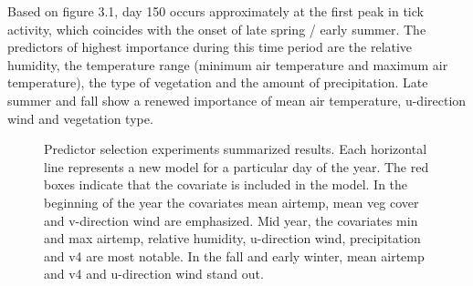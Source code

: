 \noindent Based on figure 3.1, day 150 occurs approximately at the first peak in tick activity, which coincides with the onset of late spring / early summer. The predictors of highest importance during this time period are the relative humidity, the temperature range (minimum air temperature and maximum air temperature), the type of vegetation and the amount of precipitation. Late summer and fall show a renewed importance of mean air temperature, u-direction wind and vegetation type.  \newline

\begin{figure} [!ht]
\centerline{}
\caption{Predictor selection experiments summarized results. Each horizontal line represents a new model for a particular day of the year. The red boxes indicate that the covariate is included in the model. In the beginning of the year the covariates mean airtemp,  mean veg cover and v-direction wind are emphasized. Mid year, the covariates min and max airtemp, relative humidity, u-direction wind, precipitation and v4 are most notable.  In the fall and early winter, mean airtemp and v4 and u-direction wind stand out.}
\label{fig6}
\end{figure}


